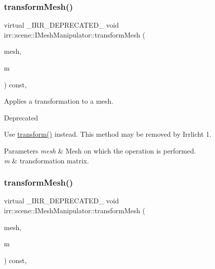 \subsubsection{\texorpdfstring{transform\+Mesh()}{transformMesh()}\hspace{0.1cm}{\footnotesize\ttfamily [1/2]}}
{\footnotesize\ttfamily virtual \+\_\+\+I\+R\+R\+\_\+\+D\+E\+P\+R\+E\+C\+A\+T\+E\+D\+\_\+ void irr\+::scene\+::\+I\+Mesh\+Manipulator\+::transform\+Mesh (\begin{DoxyParamCaption}\item[{\hyperlink{classirr_1_1scene_1_1IMesh}{I\+Mesh} $\ast$}]{mesh,  }\item[{const \hyperlink{namespaceirr_1_1core_a4c9d4e29899535971052810954a14431}{core\+::matrix4} \&}]{m }\end{DoxyParamCaption}) const\hspace{0.3cm}{\ttfamily [inline]}, {\ttfamily [virtual]}}



Applies a transformation to a mesh. 

\begin{DoxyRefDesc}{Deprecated}
\item[\hyperlink{deprecated__deprecated000015}{Deprecated}]Use \hyperlink{classirr_1_1scene_1_1IMeshManipulator_a9f9962d31cbd4ebeb1be0812765884cf}{transform()} instead. This method may be removed by Irrlicht 1. \end{DoxyRefDesc}

\begin{DoxyParams}{Parameters}
{\em mesh} & Mesh on which the operation is performed. \\
\hline
{\em m} & transformation matrix. \\
\hline
\end{DoxyParams}
\mbox{\label{classirr_1_1scene_1_1IMeshManipulator_a10e09e28622a5d1f5fd0f3a65fd2cb5b}} 
\subsubsection{\texorpdfstring{transform\+Mesh()}{transformMesh()}\hspace{0.1cm}{\footnotesize\ttfamily [2/2]}}
{\footnotesize\ttfamily virtual \+\_\+\+I\+R\+R\+\_\+\+D\+E\+P\+R\+E\+C\+A\+T\+E\+D\+\_\+ void irr\+::scene\+::\+I\+Mesh\+Manipulator\+::transform\+Mesh (\begin{DoxyParamCaption}\item[{\hyperlink{classirr_1_1scene_1_1IMesh}{I\+Mesh} $\ast$}]{mesh,  }\item[{const \hyperlink{namespaceirr_1_1core_a4c9d4e29899535971052810954a14431}{core\+::matrix4} \&}]{m }\end{DoxyParamCaption}) const\hspace{0.3cm}{\ttfamily [inline]}, {\ttfamily [virtual]}}



